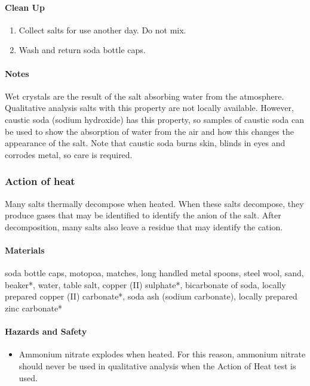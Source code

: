 \paragraph{Clean Up}
\begin{enumerate}
\item{Collect salts for use another day. Do not mix.}
\item{Wash and return soda bottle caps.}
\end{enumerate}

\paragraph{Notes}

Wet crystals are the result of the salt absorbing water from the atmosphere. Qualitative analysis salts with this property are not locally available. However, caustic soda (sodium hydroxide) has this property, so samples of caustic soda can be used to show the absorption of water from the air and how this changes the appearance of the salt. Note that caustic soda burns skin, blinds in eyes and corrodes metal, so care is required.
\subsubsection{Action of heat}

Many salts thermally decompose when heated. When these salts decompose, they produce gases that may be identified to identify the anion of the salt. After decomposition, many salts also leave a residue that may identify the cation.

\paragraph{Materials}
soda bottle caps, motopoa, matches, long handled metal spoons, steel wool, sand, beaker*, water, table salt, copper (II) sulphate*, bicarbonate of soda, locally prepared copper (II) carbonate*, soda ash (sodium carbonate), locally prepared zinc carbonate*


\paragraph{Hazards and Safety}
\begin{itemize}
\item{Ammonium nitrate explodes when heated. For this reason, ammonium nitrate should never be used in qualitative analysis when the Action of Heat test is used.}
\end{itemize}

